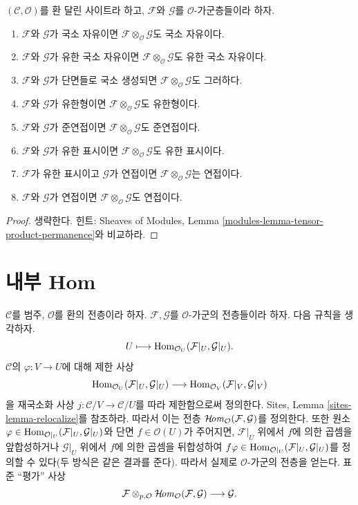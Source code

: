 \begin{lemma}
\label{lemma-tensor-product-permanence}
$(\mathcal{C}, \mathcal{O})$를 환 달린 사이트라 하고,
$\mathcal{F}$와 $\mathcal{G}$를 $\mathcal{O}$-가군층들이라 하자.
\begin{enumerate}
\item $\mathcal{F}$와 $\mathcal{G}$가 국소 자유이면
$\mathcal{F} \otimes_\mathcal{O} \mathcal{G}$도 국소 자유이다.
\item $\mathcal{F}$와 $\mathcal{G}$가 유한 국소 자유이면
$\mathcal{F} \otimes_\mathcal{O} \mathcal{G}$도 유한 국소 자유이다.
\item $\mathcal{F}$와 $\mathcal{G}$가 단면들로 국소 생성되면
$\mathcal{F} \otimes_\mathcal{O} \mathcal{G}$도 그러하다.
\item $\mathcal{F}$와 $\mathcal{G}$가 유한형이면
$\mathcal{F} \otimes_\mathcal{O} \mathcal{G}$도 유한형이다.
\item $\mathcal{F}$와 $\mathcal{G}$가 준연접이면
$\mathcal{F} \otimes_\mathcal{O} \mathcal{G}$도 준연접이다.
\item $\mathcal{F}$와 $\mathcal{G}$가 유한 표시이면
$\mathcal{F} \otimes_\mathcal{O} \mathcal{G}$도 유한 표시이다.
\item $\mathcal{F}$가 유한 표시이고 $\mathcal{G}$가 연접이면
$\mathcal{F} \otimes_\mathcal{O} \mathcal{G}$는 연접이다.
\item $\mathcal{F}$와 $\mathcal{G}$가 연접이면
$\mathcal{F} \otimes_\mathcal{O} \mathcal{G}$도 연접이다.
\end{enumerate}
\end{lemma}

\begin{proof}
생략한다. 힌트: Sheaves of Modules, Lemma
\ref{modules-lemma-tensor-product-permanence}와 비교하라.
\end{proof}



\section{내부 Hom}
\label{section-internal-hom}

\noindent
$\mathcal{C}$를 범주, $\mathcal{O}$를 환의 전층이라 하자.
$\mathcal{F}, \mathcal{G}$를 $\mathcal{O}$-가군의 전층들이라 하자.
다음 규칙을 생각하자.
$$
U \longmapsto \mathop{\mathrm{Hom}}\nolimits_{\mathcal{O}_U}(\mathcal{F}|_U, \mathcal{G}|_U).
$$
$\mathcal{C}$의 $\varphi : V \to U$에 대해 제한 사상
$$
\mathop{\mathrm{Hom}}\nolimits_{\mathcal{O}_U}(\mathcal{F}|_U, \mathcal{G}|_U)
\longrightarrow
\mathop{\mathrm{Hom}}\nolimits_{\mathcal{O}_V}(\mathcal{F}|_V, \mathcal{G}|_V)
$$
을 재국소화 사상 $j : \mathcal{C}/V \to \mathcal{C}/U$를 따라 제한함으로써
정의한다. Sites, Lemma \ref{sites-lemma-relocalize}를 참조하라. 따라서 이는
전층 $\mathop{\mathcal{H}\!\mathit{om}}\nolimits_\mathcal{O}(\mathcal{F}, \mathcal{G})$를 정의한다. 또한 원소
$\varphi \in \mathop{\mathrm{Hom}}\nolimits_{\mathcal{O}|_U}(\mathcal{F}|_U, \mathcal{G}|_U)$와 단면
$f \in \mathcal{O}(U)$가 주어지면, $\mathcal{F}|_U$ 위에서 $f$에 의한
곱셈을 앞합성하거나 $\mathcal{G}|_U$ 위에서 $f$에 의한 곱셈을 뒤합성하여
$f\varphi \in \mathop{\mathrm{Hom}}\nolimits_{\mathcal{O}|_U}(\mathcal{F}|_U, \mathcal{G}|_U)$를
정의할 수 있다(두 방식은 같은 결과를 준다). 따라서 실제로
$\mathcal{O}$-가군의 전층을 얻는다. 표준 ``평가'' 사상
$$
\mathcal{F}
\otimes_{p, \mathcal{O}}
\mathop{\mathcal{H}\!\mathit{om}}\nolimits_\mathcal{O}(\mathcal{F}, \mathcal{G})
\longrightarrow
\mathcal{G}.
$$

